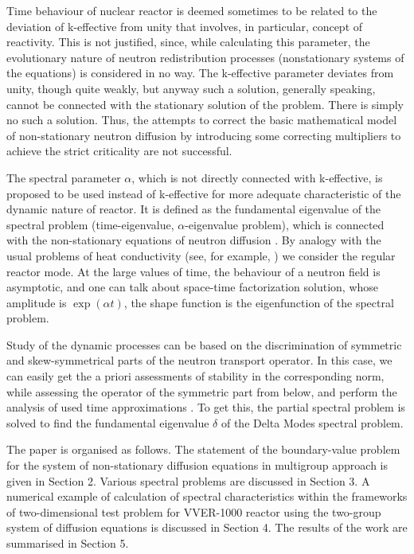 \documentclass[authoryear]{elsarticle}
\begin{document}
Time behaviour of nuclear reactor is deemed sometimes to be related to the deviation of k-effective from unity that involves, in particular, concept of reactivity. This is not justified, since, while calculating this parameter, the evolutionary nature of neutron redistribution processes (nonstationary systems of the equations) is considered in no way. The k-effective parameter deviates from unity, though quite weakly, but anyway such a solution, generally speaking, cannot be connected with the stationary solution of the problem. There is simply no such a solution. Thus, the attempts to correct the basic mathematical model of non-stationary neutron diffusion by introducing some correcting multipliers to achieve the strict criticality are not successful.

The spectral parameter $\alpha$, which is not directly connected with k-effective, is proposed to be used instead of k-effective for more adequate characteristic of the dynamic nature of reactor. It is defined as the fundamental eigenvalue of the spectral problem (time-eigenvalue, $\alpha$-eigenvalue problem), which is connected with the non-stationary equations of neutron diffusion
\cite{Bell1970,modak2007scheme,verdu20103d}.
By analogy with the usual problems of heat conductivity (see, for example,
\cite{luikov2012analytical,samarskii1996computational}) we consider the regular reactor mode. At the large values of time, the behaviour of a neutron field is asymptotic, and one can talk about space-time factorization solution, whose amplitude is $\exp(\alpha t)$, the shape function is the eigenfunction of the spectral problem. 

Study of the dynamic processes can be based on the discrimination of symmetric and skew-symmetrical parts of the neutron transport operator. In this case, we can easily get the a priori assessments of stability in the corresponding norm, while assessing the operator of the symmetric part from below, and perform the analysis of used time approximations
\cite{Samarskiibook,SamarskiiMatusVabischevich2002}. 
To get this, the partial spectral problem is solved to find the fundamental eigenvalue $\delta$ of the Delta Modes spectral problem.

The paper is organised as follows. The statement of the boundary-value problem for the system of non-stationary diffusion equations in multigroup approach is given in Section 2. Various spectral problems are discussed in Section 3. A numerical example of calculation of spectral characteristics within the frameworks of two-dimensional test problem for VVER-1000 reactor using the two-group system of diffusion equations is discussed in Section 4. The results of the work are summarised in Section 5.
\end{document}
